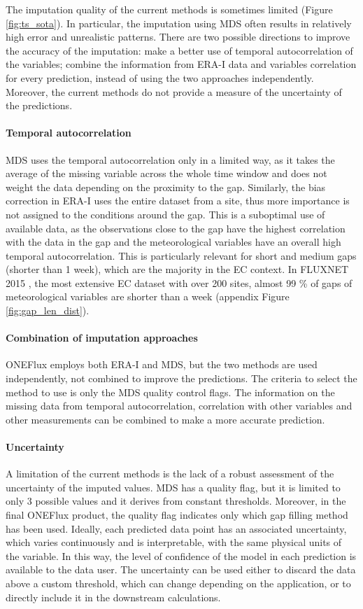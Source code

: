 \documentclass{article}
\begin{document}
The imputation quality of the current methods is sometimes limited (Figure \ref{fig:ts_sota}). In particular, the imputation using MDS often results in relatively high error and unrealistic patterns. There are two possible directions to improve the accuracy of the imputation:  make a better use of temporal autocorrelation of the variables; combine the information from ERA-I data and variables correlation for every prediction, instead of using the two approaches independently. Moreover, the current methods do not provide a measure of the uncertainty of the predictions.

\paragraph{Temporal autocorrelation} MDS uses the temporal autocorrelation only in a limited way, as it takes the average of the missing variable across the whole time window and does not weight the data depending on the proximity to the gap.  Similarly, the bias correction in ERA-I uses the entire dataset from a site, thus more importance is not assigned to the conditions around the gap.  This is a suboptimal use of available data, as the observations close to the gap have the highest correlation with the data in the gap and the meteorological variables have an overall high temporal autocorrelation. This is particularly relevant for short and medium gaps (shorter than 1 week), which are the majority in the EC context.
In FLUXNET 2015 \cite{pastorello_fluxnet2015_2020}, the most extensive EC dataset with over 200 sites, almost 99 \% of gaps of meteorological variables are shorter than a week (appendix Figure \ref{fig:gap_len_dist}).

\paragraph{Combination of imputation approaches} ONEFlux employs both ERA-I and MDS, but the two methods are used independently, not combined to improve the predictions. The criteria to select the method to use is only the MDS quality control flags. The information on the missing data from temporal autocorrelation, correlation with other variables and other measurements can be combined to make a more accurate prediction.

\paragraph{Uncertainty} A limitation of the current methods is the lack of a robust assessment of the uncertainty of the imputed values. MDS has a quality flag, but it is limited to only 3 possible values and it derives from constant thresholds. Moreover, in the final ONEFlux product, the quality flag indicates only which gap filling method has been used. Ideally, each predicted data point has an associated uncertainty, which varies continuously and is interpretable, with the same physical units of the variable.  In this way, the level of confidence of the model in each prediction is available to the data user. The uncertainty can be used either to discard the data above a custom threshold, which can change depending on the application, or to directly include it in the downstream calculations.
\end{document}
